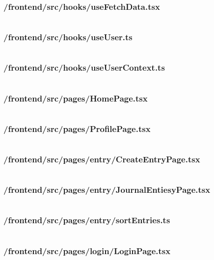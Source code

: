 \subsubsection{/frontend/src/hooks/useFetchData.tsx}
\inputminted{typescript}{SourceCode/frontend/src/hooks/useFetchData.tsx}
\subsubsection{/frontend/src/hooks/useUser.ts}
\inputminted{typescript}{SourceCode/frontend/src/hooks/useUser.ts}
\subsubsection{/frontend/src/hooks/useUserContext.ts}
\inputminted{typescript}{SourceCode/frontend/src/hooks/useUserContext.ts}

\subsubsection{/frontend/src/pages/HomePage.tsx}
\inputminted{typescript}{SourceCode/frontend/src/pages/HomePage.tsx}
\subsubsection{/frontend/src/pages/ProfilePage.tsx}
\inputminted{typescript}{SourceCode/frontend/src/pages/ProfilePage.tsx}
\subsubsection{/frontend/src/pages/entry/CreateEntryPage.tsx}
\inputminted{typescript}{SourceCode/frontend/src/pages/entry/CreateEntryPage.tsx}
\subsubsection{/frontend/src/pages/entry/JournalEntiesyPage.tsx}
\inputminted{typescript}{SourceCode/frontend/src/pages/entry/JournalEntriesPage.tsx}
\subsubsection{/frontend/src/pages/entry/sortEntries.ts}
\inputminted{typescript}{SourceCode/frontend/src/pages/entry/sortEntries.ts}
\subsubsection{/frontend/src/pages/login/LoginPage.tsx}
\inputminted{typescript}{SourceCode/frontend/src/pages/login/LoginPage.tsx}
